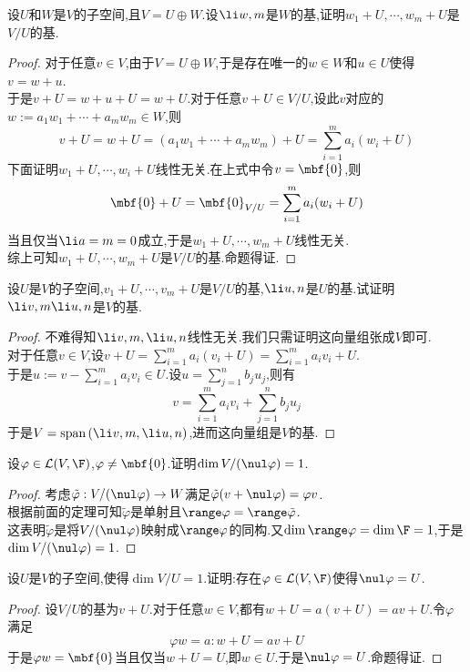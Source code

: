 \documentclass{ctexart}
\begin{document}
\begin{problem}[14.]
    设$U$和$W$是$V$的子空间,且$V=U\oplus W$.设$\li w,m$是$W$的基,证明$w_1+U,\cdots,w_m+U$是$V/U$的基.
\end{problem}
\begin{proof}
    对于任意$v\in V$,由于$V=U\oplus W$,于是存在唯一的$w\in W$和$u\in U$使得$v=w+u$.\\
    于是$v+U=w+u+U=w+U$.对于任意$v+U\in V/U$,设此$v$对应的$w:=a_1w_1+\cdots+a_mw_m\in W$,则
    $$v+U=w+U=(a_1w_1+\cdots+a_mw_m)+U=\sum_{i=1}^{m}a_i(w_i+U)$$
    下面证明$w_1+U,\cdots,w_i+U$线性无关.在上式中令$v=\mbf{0}$,则
    $$\mbf{0}+U=\mbf{0}_{V/U}=\sum_{i=1}^{m}a_i(w_i+U)$$
    当且仅当$\li a=m=0$成立,于是$w_1+U,\cdots,w_m+U$线性无关.\\
    综上可知$w_1+U,\cdots,w_m+U$是$V/U$的基.命题得证.
\end{proof}
\begin{problem}[15.]
    设$U$是$V$的子空间,$v_1+U,\cdots,v_m+U$是$V/U$的基,$\li u,n$是$U$的基.试证明$\li v,m\li u,n$是$V$的基.
\end{problem}
\begin{proof}
    不难得知$\li v,m,\li u,n$线性无关.我们只需证明这向量组张成$V$即可.\\
    对于任意$v\in V$,设$\displaystyle v+U=\sum_{i=1}^{m}a_i(v_i+U)=\sum_{i=1}^ma_iv_i+U$.\\
    于是$u:=\displaystyle v-\sum_{i=1}^ma_iv_i\in U$.设$u=\sum_{j=1}^{n}b_ju_j$,则有
    $$v=\sum_{i=1}^ma_iv_i+\sum_{j=1}^nb_ju_j$$
    于是$V=\text{span}\left(\li v,m,\li u,n\right)$,进而这向量组是$V$的基.
\end{proof}
\begin{problem}[16.]
    设$\varphi\in\mathcal{L}(V,\F)$,$\varphi\neq\mbf{0}$.证明$\dim V/(\nul\varphi)=1$.
\end{problem}
\begin{proof}
    考虑$\tilde{\varphi}:V/(\nul\varphi)\to W$满足$\tilde{\varphi}(v+\nul\varphi)=\varphi v$.\\
    根据前面的定理可知$\tilde{\varphi}$是单射且$\range\varphi=\range\tilde{\varphi}$.\\
    这表明$\tilde{\varphi}$是将$V/(\nul\varphi)$映射成$\range\varphi$的同构.又$\dim\range\varphi=\dim\F=1$,于是$\dim V/(\nul\varphi)=1$.
\end{proof}
\begin{problem}[17.]
    设$U$是$V$的子空间,使得$\dim V/U=1$.证明:存在$\varphi\in\mathcal{L}(V,\F)$使得$\nul\varphi=U$.
\end{problem}
\begin{proof}
    设$V/U$的基为$v+U$.对于任意$w\in V$,都有$w+U=a(v+U)=av+U$.令$\varphi$满足
    $$\varphi w=a:w+U=av+U$$
    于是$\varphi w=\mbf{0}$当且仅当$w+U=U$,即$w\in U$.于是$\nul\varphi=U$.命题得证.
\end{proof}
\end{document}
